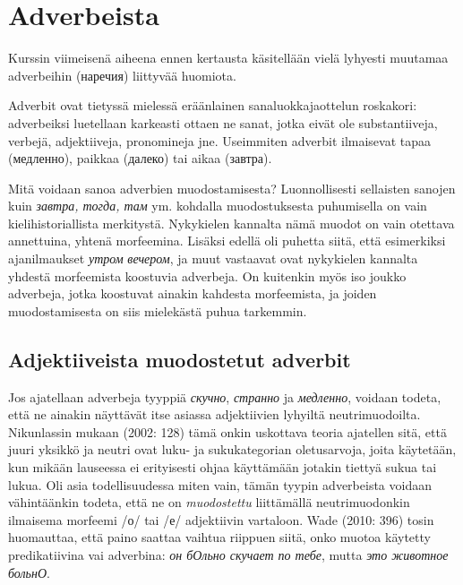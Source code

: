 \documentclass[]{scrreprt}
\begin{document}
\section{Adverbeista}\label{adverbeista}

Kurssin viimeisenä aiheena ennen kertausta käsitellään vielä lyhyesti
muutamaa adverbeihin (наречия) liittyvää huomiota.

Adverbit ovat tietyssä mielessä eräänlainen sanaluokkajaottelun
roskakori: adverbeiksi luetellaan karkeasti ottaen ne sanat, jotka eivät
ole substantiiveja, verbejä, adjektiiveja, pronomineja jne. Useimmiten
adverbit ilmaisevat tapaa (медленно), paikkaa (далеко) tai aikaa
(завтра).

Mitä voidaan sanoa adverbien muodostamisesta? Luonnollisesti sellaisten
sanojen kuin \emph{завтра, тогда, там} ym. kohdalla muodostuksesta
puhumisella on vain kielihistoriallista merkitystä. Nykykielen kannalta
nämä muodot on vain otettava annettuina, yhtenä morfeemina. Lisäksi
edellä oli puhetta siitä, että esimerkiksi ajanilmaukset \emph{утром}
\emph{вечером}, ja muut vastaavat ovat nykykielen kannalta yhdestä
morfeemista koostuvia adverbeja. On kuitenkin myös iso joukko adverbeja,
jotka koostuvat ainakin kahdesta morfeemista, ja joiden muodostamisesta
on siis mielekästä puhua tarkemmin.

\subsection{Adjektiiveista muodostetut
adverbit}\label{adjektiiveista-muodostetut-adverbit}

Jos ajatellaan adverbeja tyyppiä \emph{скучно}, \emph{странно} ja
\emph{медленно}, voidaan todeta, että ne ainakin näyttävät itse asiassa
adjektiivien lyhyiltä neutrimuodoilta. Nikunlassin mukaan (2002: 128)
tämä onkin uskottava teoria ajatellen sitä, että juuri yksikkö ja neutri
ovat luku- ja sukukategorian oletusarvoja, joita käytetään, kun mikään
lauseessa ei erityisesti ohjaa käyttämään jotakin tiettyä sukua tai
lukua. Oli asia todellisuudessa miten vain, tämän tyypin adverbeista
voidaan vähintäänkin todeta, että ne on \emph{muodostettu} liittämällä
neutrimuodonkin ilmaisema morfeemi /о/ tai /е/ adjektiivin vartaloon.
Wade (2010: 396) tosin huomauttaa, että paino saattaa vaihtua riippuen
siitä, onko muotoa käytetty predikatiivina vai adverbina: \emph{он
бОльно скучает по тебе}, mutta \emph{это животное больнО}.
\end{document}
